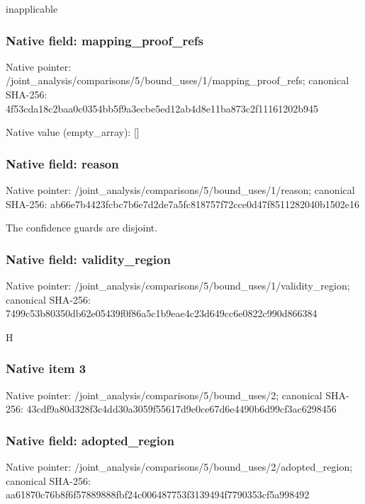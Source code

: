 \documentclass[10pt,a4paper]{article}
\begin{document}
\begingroup\raggedright\sloppy inapplicable\par\endgroup

\subsubsection{Native field: mapping\_\allowbreak{}proof\_\allowbreak{}refs}
Native pointer: /joint\_\allowbreak{}analysis/comparisons/5/bound\_\allowbreak{}uses/1/mapping\_\allowbreak{}proof\_\allowbreak{}refs; canonical SHA-256: 4f53cda18c2baa0c0354bb5f9a3ecbe5ed12ab4d8e11ba873c2f11161202b945

Native value (empty\_\allowbreak{}array): []

\subsubsection{Native field: reason}
Native pointer: /joint\_\allowbreak{}analysis/comparisons/5/bound\_\allowbreak{}uses/1/reason; canonical SHA-256: ab66e7b4423fcbc7b6e7d2de7a5fc818757f72cce0d47f8511282040b1502e16

\begingroup\raggedright\sloppy The confidence guards are disjoint.\par\endgroup

\subsubsection{Native field: validity\_\allowbreak{}region}
Native pointer: /joint\_\allowbreak{}analysis/comparisons/5/bound\_\allowbreak{}uses/1/validity\_\allowbreak{}region; canonical SHA-256: 7499c53b80350db62e05439f0f86a5c1b9eae4c23d649cc6e0822c990d866384

\begingroup\raggedright\sloppy H\par\endgroup

\subsubsection{Native item 3}
Native pointer: /joint\_\allowbreak{}analysis/comparisons/5/bound\_\allowbreak{}uses/2; canonical SHA-256: 43cdf9a80d328f3c4dd30a3059f55617d9e0ce67d6e4490b6d99cf3ac6298456

\subsubsection{Native field: adopted\_\allowbreak{}region}
Native pointer: /joint\_\allowbreak{}analysis/comparisons/5/bound\_\allowbreak{}uses/2/adopted\_\allowbreak{}region; canonical SHA-256: aa61870c76b8f6f57889888fbf24c006487753f3139494f7790353cf5a998492
\end{document}
